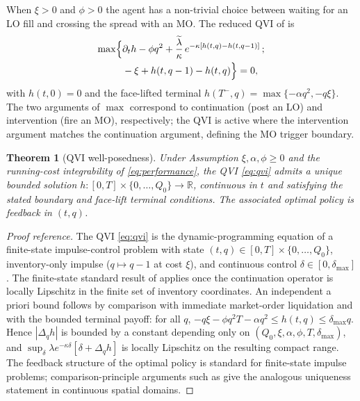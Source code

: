 \documentclass[]{interact}
\theoremstyle{plain}
\newtheorem{theorem}{Theorem}[section]
\theoremstyle{definition}
\theoremstyle{remark}
\newcommand{\1}[1]{\mathbf{1}_{\{#1\}}}
\newcommand{\ltil}{\widetilde{\lambda}}
\begin{document}
When $\xi > 0$ and $\phi > 0$ the agent has a non-trivial choice between waiting for an LO fill and crossing the spread with an MO. The reduced QVI of \citet{carteajaimungal2015} is
\begin{equation}\label{eq:qvi}
\begin{split}
\max\Bigl\{
&\partial_t h - \phi q^2 + \frac{\ltil}{\kappa}\, e^{-\kappa[h(t,q)-h(t,q-1)]}\, ;\\
&- \xi + h(t,q-1) - h(t,q) \Bigr\} = 0,
\end{split}
\end{equation}
with $h(t,0) = 0$ and the face-lifted terminal $h(T^-, q) = \max\{-\alpha q^2,-q\xi\}$. The two arguments of $\max$ correspond to continuation (post an LO) and intervention (fire an MO), respectively; the QVI is active where the intervention argument matches the continuation argument, defining the MO trigger boundary.

\begin{theorem}[QVI well-posedness]\label{thm:qvi}
Under Assumption $\xi, \alpha, \phi \ge 0$ and the running-cost integrability of \eqref{eq:performance}, the QVI \eqref{eq:qvi} admits a unique bounded solution $h:[0,T]\times\{0,\dots,Q_0\}\to\mathbb{R}$, continuous in $t$ and satisfying the stated boundary and face-lift terminal conditions. The associated optimal policy is feedback in $(t,q)$.
\end{theorem}
\begin{proof}[Proof reference]
The QVI \eqref{eq:qvi} is the dynamic-programming equation of a finite-state impulse-control problem with state $(t, q) \in [0,T] \times \{0, \dots, Q_0\}$, inventory-only impulse ($q \mapsto q - 1$ at cost $\xi$), and continuous control $\delta \in [0, \delta_{\max}]$. The finite-state standard result of \citet[\S 5.4]{pham2009stochastic} applies once the continuation operator is locally Lipschitz in the finite set of inventory coordinates. An independent a priori bound follows by comparison with immediate market-order liquidation and with the bounded terminal payoff: for all $q$, $-q\xi-\phi q^2T-\alpha q^2 \le h(t,q) \le \delta_{\max}q$. Hence $|\Delta_q h|$ is bounded by a constant depending only on $(Q_0,\xi,\alpha,\phi,T,\delta_{\max})$, and $\sup_\delta \lambda e^{-\kappa\delta}[\delta+\Delta_q h]$ is locally Lipschitz on the resulting compact range. The feedback structure of the optimal policy is standard for finite-state impulse problems; comparison-principle arguments such as \citet[Theorem 4.1]{bouchardtouzi2011} give the analogous uniqueness statement in continuous spatial domains.
\end{proof}
\end{document}
